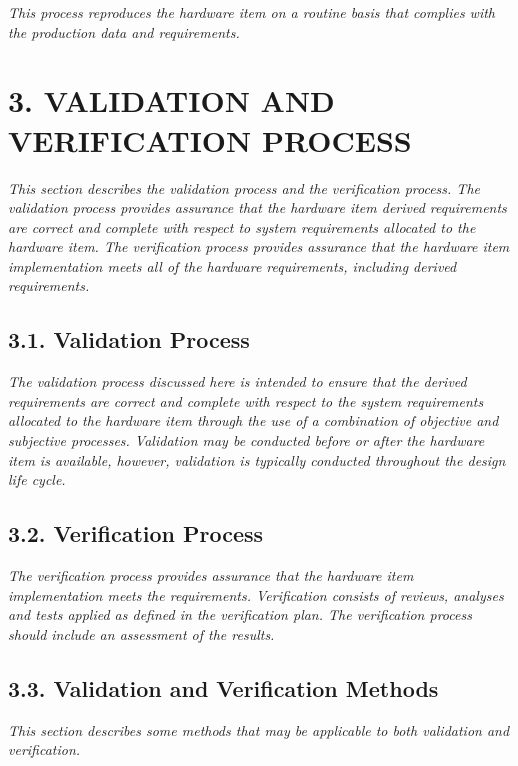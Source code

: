 \documentclass[]{article}
\begin{document}
\emph{This process reproduces the hardware item on a routine basis that
complies with the production data and requirements.}

\section{3. VALIDATION AND VERIFICATION
PROCESS}\label{validation-and-verification-process}

\emph{This section describes the validation process and the verification
process. The validation process provides assurance that the hardware
item derived requirements are correct and complete with respect to
system requirements allocated to the hardware item. The verification
process provides assurance that the hardware item implementation meets
all of the hardware requirements, including derived requirements.}

\subsection{3.1. Validation Process}\label{validation-process}

\emph{The validation process discussed here is intended to ensure that
the derived requirements are correct and complete with respect to the
system requirements allocated to the hardware item through the use of a
combination of objective and subjective processes. Validation may be
conducted before or after the hardware item is available, however,
validation is typically conducted throughout the design life cycle.}

\subsection{3.2. Verification Process}\label{verification-process}

\emph{The verification process provides assurance that the hardware item
implementation meets the requirements. Verification consists of reviews,
analyses and tests applied as defined in the verification plan. The
verification process should include an assessment of the results.}

\subsection{3.3. Validation and Verification
Methods}\label{validation-and-verification-methods}

\emph{This section describes some methods that may be applicable to both
validation and verification.}
\end{document}
